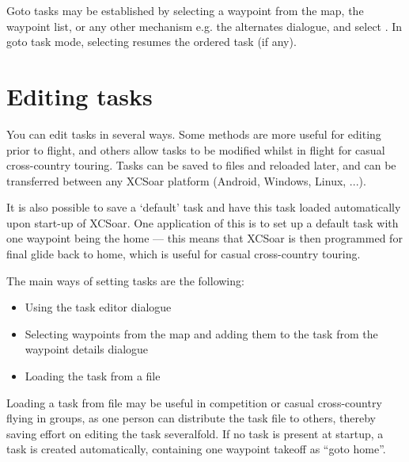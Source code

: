 Goto tasks may be established by selecting a waypoint from the map,
the waypoint list, or any other mechanism e.g. the alternates dialogue, 
and select . In goto task mode, selecting
\blink{} resumes the ordered task (if
any).

\section{Editing tasks}

You can edit tasks in several ways.  Some methods are more useful for
editing prior to flight, and others allow tasks to be modified whilst
in flight for casual cross-country touring.  Tasks can be saved to
files and reloaded later, and can be transferred between any XCSoar
platform (Android, Windows, Linux, ...).

\tip It is also possible to save a `default' task and have this task loaded
automatically upon start-up of XCSoar.  One application of this is to
set up a default task with one waypoint being the home --- this means
that XCSoar is then programmed for final glide back to home, which is
useful for casual cross-country touring.

The main ways of setting tasks are the following:
\begin{itemize}
\item Using the task editor dialogue
\item Selecting waypoints from the map and adding them to the task from the
 waypoint details dialogue
\item Loading the task from a file
\end{itemize}

%

Loading a task from file may be useful in competition or casual
cross-country flying in groups, as one person can distribute the task
file to others, thereby saving effort on editing the task severalfold.
\tip
If no task is present at startup, a task is created automatically,
containing one waypoint takeoff as ``goto home''.

